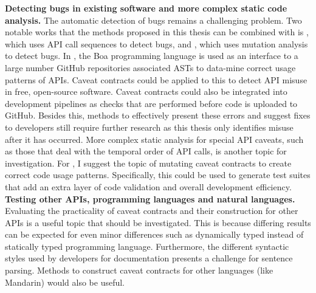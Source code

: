 \noindent
\textbf{Detecting bugs in existing software and more complex static code analysis.} The automatic detection of bugs remains a challenging problem. Two notable works that the methods proposed in this thesis can be combined with is \cite{code-examples}, which uses API call sequences to detect bugs, and \cite{mutation-analysis}, which uses mutation analysis to detect bugs. In \cite{code-examples}, the Boa programming language is used as an interface to a large number GitHub repositories associated ASTs to data-mine correct usage patterns of APIs. Caveat contracts could be applied to this to detect API misuse in free, open-source software. Caveat contracts could also be integrated into development pipelines as checks that are performed before code is uploaded to GitHub. Besides this, methods to effectively present these errors and suggest fixes to developers still require further research as this thesis only identifies misuse after it has occurred. More complex static analysis for special API caveats, such as those that deal with the temporal order of API calls, is another topic for investigation. For \cite{mutation-analysis}, I suggest the topic of mutating caveat contracts to create correct code usage patterns. Specifically, this could be used to generate test suites that add an extra layer of code validation and overall development efficiency.\\

\noindent
\textbf{Testing other APIs, programming languages and natural languages.} Evaluating the practicality of caveat contracts and their construction for other APIs is a useful topic that should be investigated. This is because differing results can be expected for even minor differences such as dynamically typed instead of statically typed programming language. Furthermore, the different syntactic styles used by developers for documentation presents a challenge for sentence parsing. Methods to construct caveat contracts for other languages (like Mandarin) would also be useful.
